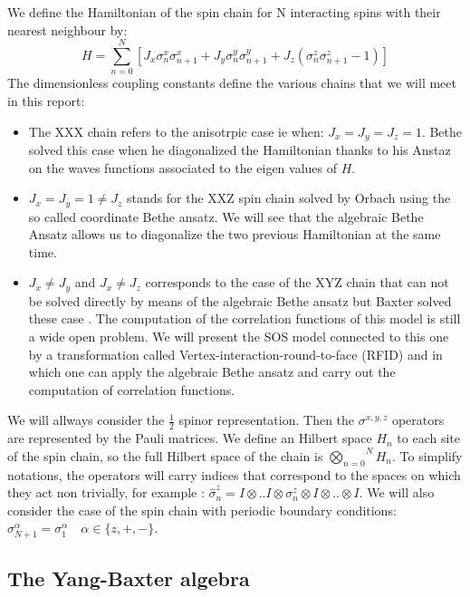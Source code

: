 \documentclass[12pt]{article}
\begin{document}
We define the Hamiltonian of the spin chain for N interacting spins with their nearest neighbour by:
\begin{equation}
H=\sum_{n=0}^{N}\left[J_{x}\sigma_{n}^{x}\sigma_{n+1}^{x}+J_{y}\sigma_{n}^{y}\sigma_{n+1}^{y}+J_{z}(\sigma_{n}^{z}\sigma_{n+1}^{z}-1)\right]
\end{equation}  
The dimensionless coupling constants define the various chains that we will meet in this report:
\begin{itemize}
\item The XXX chain refers to the anisotrpic case ie when: $J_{x}=J_{y}=J_{z}=1 $. Bethe solved this case when he diagonalized the Hamiltonian thanks to his Anstaz on the waves functions associated to the eigen values of $H$. 
\item $J_{x}=J_{y}=1 \neq J_{z}$ stands for the XXZ spin chain solved by Orbach \cite{Orb58} using the so called coordinate Bethe ansatz. We will see that the algebraic Bethe Ansatz allows us to diagonalize the two previous Hamiltonian at the same time.
\item $J_{x}\neq J_{y}$ and $ J_{x}\neq J_{z}$ corresponds to the case of the XYZ chain that can not be solved directly by means of the algebraic Bethe ansatz but Baxter solved these case \cite{Bax73}. The computation of the correlation functions of this model is still a wide open problem. We will present the SOS model connected to this one by a transformation called Vertex-interaction-round-to-face (RFID) and in which one can apply the algebraic Bethe ansatz and carry out the computation of correlation functions.
\end{itemize}
We will allways consider the $\frac{1}{2}$ spinor representation. Then the $\sigma^{x,y,z}$ operators are represented by the Pauli matrices. We define an Hilbert space $H_{n}$ to each site of the spin chain, so the full Hilbert space of the chain is  $\overset{N}{\underset{n=0}{\bigotimes}} H_{n}$.
To simplify notations, the operators will carry indices that correspond to the spaces on which they act non trivially, for example : $\widehat{\sigma}^{z}_{n}=I\otimes ..I\otimes\sigma^{z}_{n}\otimes I \otimes..\otimes I$. We will also consider the case of the spin chain with periodic boundary conditions: $\sigma^{\alpha}_{N+1}=\sigma^{\alpha}_{1} \quad \alpha \in \{z,+,-\}$.
\subsection{The Yang-Baxter algebra}
\end{document}
